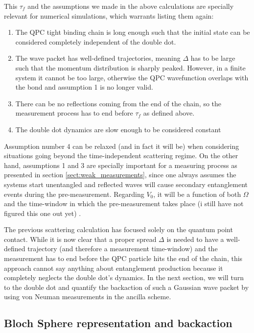 \documentclass{article}
\newcommand\sj[1]{ {\color{orange} #1} }
\begin{document}
This $\tau_f$ and the assumptions we made in the above calculations are specially relevant for numerical
simulations, which warrants listing them again: 
\begin{enumerate}
    \item The QPC tight binding
    chain is long enough such that the initial state can be considered completely 
    independent of the double dot.
    \item The wave packet has well-defined trajectories, meaning $\Delta$ has to be large such that 
        the momentum 
        distribution is sharply peaked. However, in a finite system it cannot be too large, otherwise the
        QPC wavefunction overlaps with the bond and assumption  1 is no longer valid.
    \item There can be no reflections coming from the end of the chain, so the measurement process has to
        end before $\tau_f$ as defined above.
    \item The double dot dynamics are slow enough to be considered constant 
\end{enumerate}
Assumption number 4 can be relaxed (and in fact it will be) when considering situations going beyond 
the time-independent scattering regime. On the other hand, assumptions 1 and 3 are specially 
important for a measuring process as presented in section \ref{sect:weak_measurements}, 
since one always assumes the systems start unentangled and reflected waves will 
cause secondary entanglement events during the pre-measurement. Regarding $V_0$, it will be a 
function of both $\Omega$ and the time-window in which the pre-measurement takes place \sj{(i
still have not figured this one out yet)}.

The previous scattering calculation has focused solely on the quantum point contact. While it is now 
clear that a proper spread $\Delta$ is needed to have a well-defined trajectory (and therefore a 
measurement time-window) and the measurement has to end before the QPC particle hits the end of the 
chain, this approach cannot say anything about entanglement production because it completely 
neglects the double dot's dynamics. In the next section, we will turn to the double dot and 
quantify the backaction of such a Gaussian wave packet by using von Neuman measurements in the 
ancilla scheme.


\subsection{Bloch Sphere representation and backaction}\label{sect:bloch_backaction}
\end{document}
